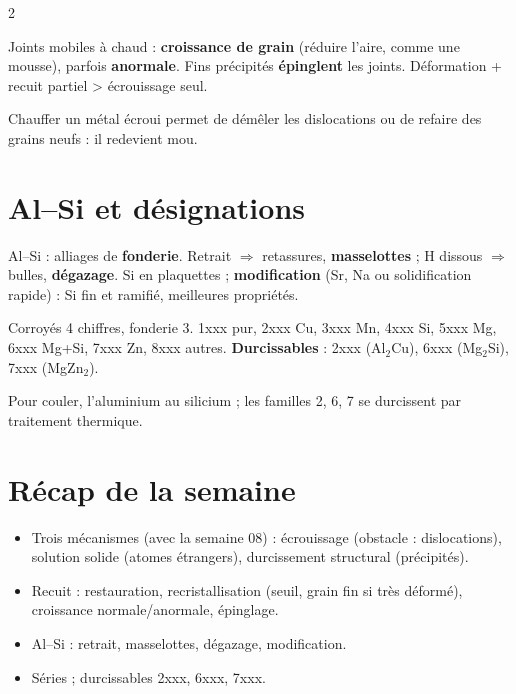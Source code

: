 \documentclass[a4paper,9pt]{extarticle}
\begin{document}
\begin{multicols}{2}
\begin{important}
Joints mobiles à chaud : \textbf{croissance de grain} (réduire l'aire, comme une mousse),
parfois \textbf{anormale}. Fins précipités \textbf{épinglent} les joints. Déformation + recuit
partiel > écrouissage seul.
\end{important}

\begin{goat}
Chauffer un métal écroui permet de démêler les dislocations ou de refaire des grains neufs : il
redevient mou.
\end{goat}

\section{Al--Si et désignations}

\begin{important}
Al--Si : alliages de \textbf{fonderie}. Retrait $\Rightarrow$ retassures, \textbf{masselottes} ;
H dissous $\Rightarrow$ bulles, \textbf{dégazage}. Si en plaquettes ; \textbf{modification}
(Sr, Na ou solidification rapide) : Si fin et ramifié, meilleures propriétés.
\end{important}

\begin{definition}
Corroyés 4 chiffres, fonderie 3. 1xxx pur, 2xxx Cu, 3xxx Mn, 4xxx Si, 5xxx Mg, 6xxx Mg+Si,
7xxx Zn, 8xxx autres. \textbf{Durcissables} : 2xxx (Al$_2$Cu), 6xxx (Mg$_2$Si), 7xxx (MgZn$_2$).
\end{definition}

\begin{goat}
Pour couler, l'aluminium au silicium ; les familles 2, 6, 7 se durcissent par traitement
thermique.
\end{goat}

\section{Récap de la semaine}

\begin{recap}
\begin{itemize}
\item Trois mécanismes (avec la semaine 08) : écrouissage (obstacle : dislocations), solution
      solide (atomes étrangers), durcissement structural (précipités).
\item Recuit : restauration, recristallisation (seuil, grain fin si très déformé), croissance
      normale/anormale, épinglage.
\item Al--Si : retrait, masselottes, dégazage, modification.
\item Séries ; durcissables 2xxx, 6xxx, 7xxx.
\end{itemize}
\end{recap}

\end{multicols}
\end{document}
